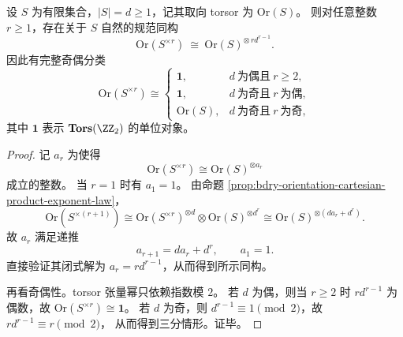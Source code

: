 \begin{theorem}\label{thm:bdry-orientation-cartesian-power-parity-collapse}
设 \(S\) 为有限集合，\(|S|=d\ge 1\)，记其取向 torsor 为 \(\mathrm{Or}(S)\)。
则对任意整数 \(r\ge 1\)，存在关于 \(S\) 自然的规范同构
\[
\mathrm{Or}(S^{\times r})\ \cong\ \mathrm{Or}(S)^{\otimes\, r d^{r-1}}.
\]
因此有完整奇偶分类
\[
\mathrm{Or}(S^{\times r})\cong
\begin{cases}
\mathbf 1, & d\ \text{为偶且}\ r\ge 2,\\[2pt]
\mathbf 1, & d\ \text{为奇且}\ r\ \text{为偶},\\[2pt]
\mathrm{Or}(S), & d\ \text{为奇且}\ r\ \text{为奇},
\end{cases}
\]
其中 \(\mathbf 1\) 表示 \(\mathbf{Tors}(\ZZ_2)\) 的单位对象。
\end{theorem}
\begin{proof}
记 \(a_r\) 为使得
\[
\mathrm{Or}(S^{\times r})\cong \mathrm{Or}(S)^{\otimes a_r}
\]
成立的整数。
当 \(r=1\) 时有 \(a_1=1\)。
由命题 \ref{prop:bdry-orientation-cartesian-product-exponent-law}，
\[
\mathrm{Or}(S^{\times(r+1)})
\cong
\mathrm{Or}(S^{\times r})^{\otimes d}\otimes \mathrm{Or}(S)^{\otimes d^r}
\cong
\mathrm{Or}(S)^{\otimes (d a_r+d^r)}.
\]
故 \(a_r\) 满足递推
\[
a_{r+1}=d a_r+d^r,\qquad a_1=1.
\]
直接验证其闭式解为 \(a_r=r d^{r-1}\)，从而得到所示同构。
\par
再看奇偶性。torsor 张量幂只依赖指数模 \(2\)。
若 \(d\) 为偶，则当 \(r\ge 2\) 时 \(r d^{r-1}\) 为偶数，故 \(\mathrm{Or}(S^{\times r})\cong \mathbf 1\)。
若 \(d\) 为奇，则 \(d^{r-1}\equiv 1\pmod 2\)，故
\(
r d^{r-1}\equiv r\pmod 2
\)，
从而得到三分情形。证毕。
\end{proof}

